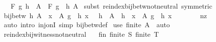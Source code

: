 \begin{isabellebody}
\ \ \ {\isachardoublequoteopen}F\ g\ {\isacharparenleft}{\kern0pt}h\ {\isacharbackquote}{\kern0pt}\ A{\isacharparenright}{\kern0pt}\ {\isacharequal}{\kern0pt}\ F\ {\isacharparenleft}{\kern0pt}g\ {\isasymcirc}\ h{\isacharparenright}{\kern0pt}\ A{\isachardoublequoteclose}\isanewline
%
\isadelimproof
%
\endisadelimproof
%
\isatagproof
{}\isamarkupfalse%
\ {\isacharparenleft}{\kern0pt}subst\ reindex{\isacharunderscore}{\kern0pt}bij{\isacharunderscore}{\kern0pt}betw{\isacharunderscore}{\kern0pt}not{\isacharunderscore}{\kern0pt}neutral\ {\isacharbrackleft}{\kern0pt}symmetric{\isacharbrackright}{\kern0pt}{\isacharparenright}{\kern0pt}\isanewline
\ \ \isamarkupfalse%
\ {\isachardoublequoteopen}bij{\isacharunderscore}{\kern0pt}betw\ h\ {\isacharparenleft}{\kern0pt}A\ {\isacharminus}{\kern0pt}\ {\isacharbraceleft}{\kern0pt}x\ {\isasymin}\ A{\isachardot}{\kern0pt}\ {\isacharparenleft}{\kern0pt}g\ {\isasymcirc}\ h{\isacharparenright}{\kern0pt}\ x\ {\isacharequal}{\kern0pt}\ \ {\isacharparenleft}{\kern0pt}h\ {\isacharbackquote}{\kern0pt}\ A\ {\isacharminus}{\kern0pt}\ h\ {\isacharbackquote}{\kern0pt}\ {\isacharbraceleft}{\kern0pt}x\ {\isasymin}\ A{\isachardot}{\kern0pt}\ {\isacharparenleft}{\kern0pt}g\ {\isasymcirc}\ h{\isacharparenright}{\kern0pt}\ x\ {\isacharequal}{\kern0pt}\ \isanewline
\ \ \ \ \isamarkupfalse%
\ nz\ \isamarkupfalse%
\ {\isacharparenleft}{\kern0pt}auto\ intro{\isacharbang}{\kern0pt}{\isacharcolon}{\kern0pt}\ inj{\isacharunderscore}{\kern0pt}onI\ simp{\isacharcolon}{\kern0pt}\ bij{\isacharunderscore}{\kern0pt}betw{\isacharunderscore}{\kern0pt}def{\isacharparenright}{\kern0pt}\isanewline
{}\isamarkupfalse%
\ {\isacharparenleft}{\kern0pt}use\ {\isacartoucheopen}finite\ A{\isacartoucheclose}\ \ auto{\isacharparenright}{\kern0pt}%
\endisatagproof
{\isafoldproof}%
%
\isadelimproof
\isanewline
%
\endisadelimproof
\isanewline
{}\isamarkupfalse%
\ reindex{\isacharunderscore}{\kern0pt}bij{\isacharunderscore}{\kern0pt}witness{\isacharunderscore}{\kern0pt}not{\isacharunderscore}{\kern0pt}neutral{\isacharcolon}{\kern0pt}\isanewline
\ \ \ fin{\isacharcolon}{\kern0pt}\ {\isachardoublequoteopen}finite\ S{\isacharprime}{\kern0pt}{\isachardoublequoteclose}\ {\isachardoublequoteopen}finite\ T{\isacharprime}{\kern0pt}{\isachardoublequoteclose}\isanewline

\end{isabellebody}
